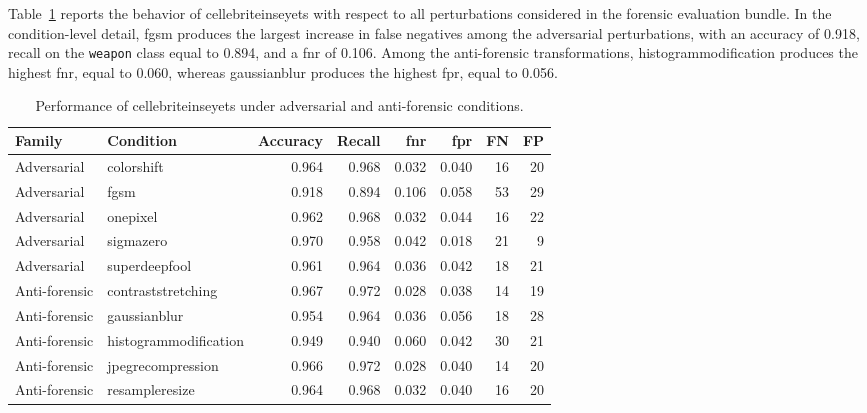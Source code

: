 Table~\ref{tab:results-cellebrite-attack-metrics} reports the behavior of
\gls{cellebriteinseyets} with respect to all perturbations considered in the
forensic evaluation bundle. In the condition-level detail, \gls{fgsm} produces
the largest increase in false negatives among the adversarial perturbations,
with an accuracy of 0.918, recall on the \texttt{weapon} class equal to 0.894,
and a \gls{fnr} of 0.106. Among the anti-forensic transformations,
\gls{histogrammodification} produces the highest \gls{fnr}, equal to 0.060,
whereas \gls{gaussianblur} produces the highest \gls{fpr}, equal to 0.056.

\begin{table}[H]
\centering
\caption{Performance of \gls{cellebriteinseyets} under adversarial and anti-forensic conditions.}
\label{tab:results-cellebrite-attack-metrics}
\scriptsize
\renewcommand{\arraystretch}{1.12}
\setlength{\tabcolsep}{4pt}
\begin{tabular}{@{}l l r r r r r r@{}}
\toprule
\textbf{Family} &
\textbf{Condition} &
\textbf{Accuracy} &
\textbf{Recall} &
\textbf{\gls{fnr}} &
\textbf{\gls{fpr}} &
\textbf{FN} &
\textbf{FP} \\
\midrule

Adversarial &
\gls{colorshift} &
0.964 &
0.968 &
0.032 &
0.040 &
16 &
20 \\

Adversarial &
\gls{fgsm} &
0.918 &
0.894 &
0.106 &
0.058 &
53 &
29 \\

Adversarial &
\gls{onepixel} &
0.962 &
0.968 &
0.032 &
0.044 &
16 &
22 \\

Adversarial &
\gls{sigmazero} &
0.970 &
0.958 &
0.042 &
0.018 &
21 &
9 \\

Adversarial &
\gls{superdeepfool} &
0.961 &
0.964 &
0.036 &
0.042 &
18 &
21 \\

\midrule

Anti-forensic &
\gls{contraststretching} &
0.967 &
0.972 &
0.028 &
0.038 &
14 &
19 \\

Anti-forensic &
\gls{gaussianblur} &
0.954 &
0.964 &
0.036 &
0.056 &
18 &
28 \\

Anti-forensic &
\gls{histogrammodification} &
0.949 &
0.940 &
0.060 &
0.042 &
30 &
21 \\

Anti-forensic &
\gls{jpegrecompression} &
0.966 &
0.972 &
0.028 &
0.040 &
14 &
20 \\

Anti-forensic &
\gls{resampleresize} &
0.964 &
0.968 &
0.032 &
0.040 &
16 &
20 \\

\bottomrule
\end{tabular}
\end{table}

